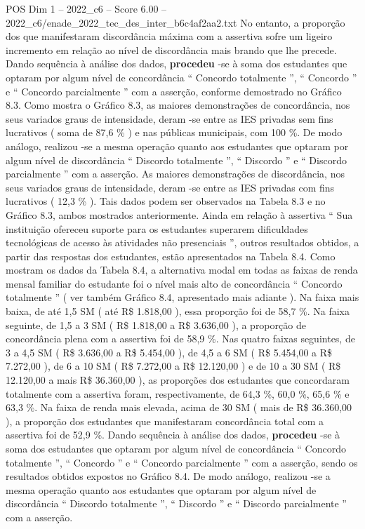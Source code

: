 \begin{textsample}{POS Dim 1 – 2022\_c6 – Score 6.00 – 2022\_c6/enade\_2022\_tec\_des\_inter\_b6c4af2aa2.txt}
No entanto, a proporção dos que manifestaram discordância máxima com a assertiva sofre um ligeiro incremento em relação ao nível de discordância mais brando que lhe precede.
Dando sequência à análise dos dados, \textbf{procedeu} -se à soma dos estudantes que optaram por algum nível de concordância “ Concordo totalmente ”, “ Concordo ” e “ Concordo parcialmente ” com a asserção, conforme demostrado no Gráfico 8.3.
Como mostra o Gráfico 8.3, as maiores demonstrações de concordância, nos seus variados graus de intensidade, deram -se entre as IES privadas sem fins lucrativos ( soma de 87,6 \% ) e nas públicas municipais, com 100 \%.
De modo análogo, realizou -se a mesma operação quanto aos estudantes que optaram por algum nível de discordância “ Discordo totalmente ”, “ Discordo ” e “ Discordo parcialmente ” com a asserção.
As maiores demonstrações de discordância, nos seus variados graus de intensidade, deram -se entre as IES privadas com fins lucrativos ( 12,3 \% ).
Tais dados podem ser observados na Tabela 8.3 e no Gráfico 8.3, ambos mostrados anteriormente.
Ainda em relação à assertiva “ Sua instituição ofereceu suporte para os estudantes superarem dificuldades tecnológicas de acesso às atividades não presenciais ”, outros resultados obtidos, a partir das respostas dos estudantes, estão apresentados na Tabela 8.4.
Como mostram os dados da Tabela 8.4, a alternativa modal em todas as faixas de renda mensal familiar do estudante foi o nível mais alto de concordância “ Concordo totalmente ” ( ver também Gráfico 8.4, apresentado mais adiante ).
Na faixa mais baixa, de até 1,5 SM ( até R\$ 1.818,00 ), essa proporção foi de 58,7 \%.
Na faixa seguinte, de 1,5 a 3 SM ( R\$ 1.818,00 a R\$ 3.636,00 ), a proporção de concordância plena com a assertiva foi de 58,9 \%.
Nas quatro faixas seguintes, de 3 a 4,5 SM ( R\$ 3.636,00 a R\$ 5.454,00 ), de 4,5 a 6 SM ( R\$ 5.454,00 a R\$ 7.272,00 ), de 6 a 10 SM ( R\$ 7.272,00 a R\$ 12.120,00 ) e de 10 a 30 SM ( R\$ 12.120,00 a mais R\$ 36.360,00 ), as proporções dos estudantes que concordaram totalmente com a assertiva foram, respectivamente, de 64,3 \%, 60,0 \%, 65,6 \% e 63,3 \%.
Na faixa de renda mais elevada, acima de 30 SM ( mais de R\$ 36.360,00 ), a proporção dos estudantes que manifestaram concordância total com a assertiva foi de 52,9 \%.
Dando sequência à análise dos dados, \textbf{procedeu} -se à soma dos estudantes que optaram por algum nível de concordância “ Concordo totalmente ”, “ Concordo ” e “ Concordo parcialmente ” com a asserção, sendo os resultados obtidos expostos no Gráfico 8.4.
De modo análogo, realizou -se a mesma operação quanto aos estudantes que optaram por algum nível de discordância “ Discordo totalmente ”, “ Discordo ” e “ Discordo parcialmente ” com a asserção.

\end{textsample}
